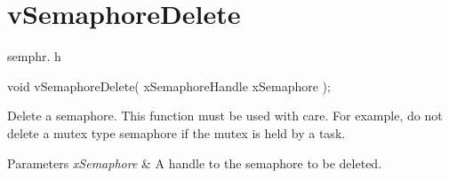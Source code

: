 \hypertarget{group__v_semaphore_delete}{\section{v\-Semaphore\-Delete}
\label{group__v_semaphore_delete}
}
semphr. h 
\begin{DoxyPre}void vSemaphoreDelete( xSemaphoreHandle xSemaphore );\end{DoxyPre}


Delete a semaphore. This function must be used with care. For example, do not delete a mutex type semaphore if the mutex is held by a task.


\begin{DoxyParams}{Parameters}
{\em x\-Semaphore} & A handle to the semaphore to be deleted. \\
\hline
\end{DoxyParams}
